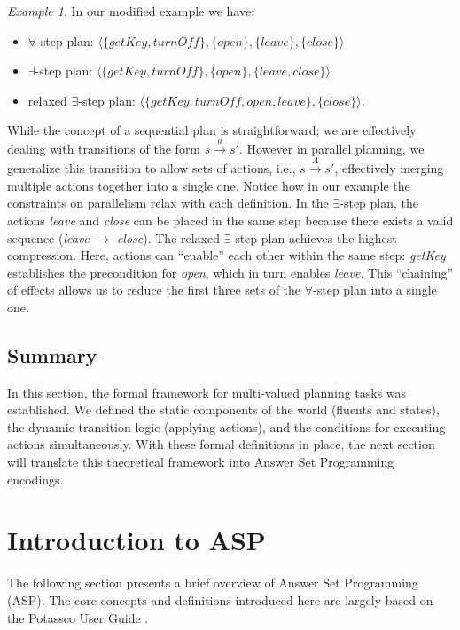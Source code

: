 \documentclass[
     11pt,                    %
     a4paper,             %
     BCOR=10mm,     %
     DIV=14,                 %
     listof=totoc,                    %
     bibliography=totoc,       %
     index=totoc,              %
     parskip            %
     twoside,
     headsepline
     ]{scrreprt}
\theoremstyle{definition}
\theoremstyle{definition}
\theoremstyle{remark}
\newtheorem{example}{\textit{Example}}
\theoremstyle{bfnote}
\begin{document}
\begin{example}
  In our modified example we have:
  \begin{itemize}
    \item $\forall$-step plan: $\langle\{getKey, \mathit{turnOff}\}, \{open\}, \{leave\}, \{close\}\rangle$
    \item $\exists$-step plan: $\langle\{getKey, \mathit{turnOff}\}, \{open\}, \{leave, close\}\rangle$
    \item relaxed $\exists$-step plan: $\langle\{getKey, \mathit{turnOff}, open, leave\}, \{close\}\rangle$.
  \end{itemize}
\end{example}

While the concept of a sequential plan is straightforward; we are effectively dealing with transitions of the form $s \xrightarrow{a} s'$. 
However in parallel planning, we generalize this transition to allow sets of actions, i.e., $s \xrightarrow{A} s'$, effectively merging multiple actions together into a single one.
Notice how in our example the constraints on parallelism relax with each definition. In the $\exists$-step plan, the actions \textit{leave} and \textit{close} can be placed in the same step because there exists a valid sequence (\textit{leave} $\to$ \textit{close}).
The relaxed $\exists$-step plan achieves the highest compression. Here, actions can \enquote{enable} each other within the same step: \textit{getKey} establishes the precondition for \textit{open}, which in turn enables \textit{leave}. This \enquote{chaining} of effects allows us to reduce the first three sets of the $\forall$-step plan into a single one.

\subsection*{Summary}

In this section, the formal framework for multi-valued planning tasks was established.
We defined the static components of the world (fluents and states), the dynamic transition logic (applying actions), and the conditions for executing actions simultaneously.
With these formal definitions in place, the next section will translate this theoretical framework into Answer Set Programming encodings.


\section{Introduction to ASP} \label{asp encoding}
The following section presents a brief overview of Answer Set Programming (ASP). The core concepts and definitions introduced here are largely based on the Potassco User Guide \parencite{potassco_guide}.
\end{document}
